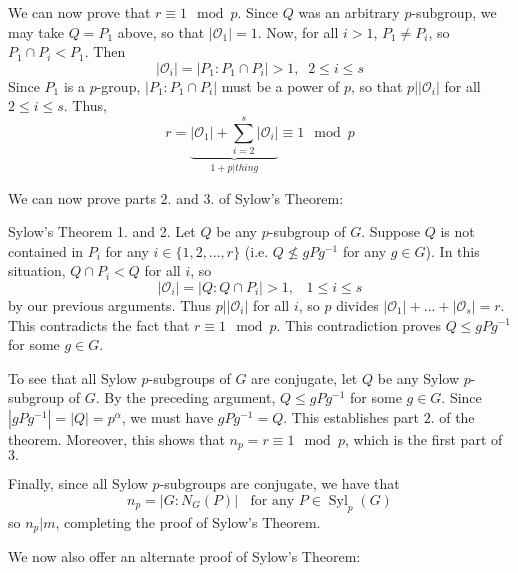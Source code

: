 \documentclass[12pt, a4paper, twoside, openright, titlepage]{book}
\begin{document}
We can now prove that $r \equiv 1\mod p$. Since $Q$ was an arbitrary $p$-subgroup, we may take $Q = P_1$ above, so that $|\mathcal{O}_1| =1$. Now, for all $i > 1$, $P_1 \neq P_i$, so $P_1 \cap P_i < P_1$. Then \begin{equation*}
    |\mathcal{O}_i| = |P_1:P_1\cap P_i| > 1,\;\; 2 \leq i \leq s
\end{equation*}
Since $P_1$ is a $p$-group, $|P_1:P_1\cap P_i|$ must be a power of $p$, so that $p\vert |\mathcal{O}_i|$ for all $2 \leq i \leq s$. Thus, \begin{equation*}
    r = \underbrace{|\mathcal{O}_1| + \sum\limits_{i=2}^s|\mathcal{O}_i|}_{1+p\vert thing} \equiv 1\mod p
\end{equation*}

We can now prove parts $2.$ and $3.$ of Sylow's Theorem:

\begin{proof*}{Sylow's Theorem 1. and 2.}{}
    Let $Q$ be any $p$-subgroup of $G$. Suppose $Q$ is not contained in $P_i$ for any $i \in \{1,2,...,r\}$ (i.e. $Q\nleq gPg^{-1}$ for any $g \in G$). In this situation, $Q\cap P_i < Q$ for all $i$, so \begin{equation*}
        |\mathcal{O}_i| = |Q:Q\cap P_i| > 1,\;\;\; 1 \leq i \leq s
    \end{equation*}
    by our previous arguments. Thus $p\vert |\mathcal{O}_i|$ for all $i$, so $p$ divides $|\mathcal{O}_1|+...+|\mathcal{O}_s| = r$. This contradicts the fact that $r \equiv 1\mod p$. This contradiction proves $Q \leq gPg^{-1}$ for some $g \in G$.

    To see that all Sylow $p$-subgroups of $G$ are conjugate, let $Q$ be any Sylow $p$-subgroup of $G$. By the preceding argument, $Q\leq gPg^{-1}$ for some $g \in G$. Since $|gPg^{-1}| = |Q| = p^{\alpha}$, we must have $gPg^{-1} = Q$. This establishes part $2.$ of the theorem. Moreover, this shows that $n_p = r \equiv 1 \mod p$, which is the first part of $3.$

    Finally, since all Sylow $p$-subgroups are conjugate, we have that \begin{equation*}
        n_p = |G:N_G(P)| \;\;\text{ for any } P \in \operatorname{Syl}_p(G)
    \end{equation*}
    so $n_p\vert m$, completing the proof of Sylow's Theorem.
\end{proof*}

We now also offer an alternate proof of Sylow's Theorem:
\end{document}
